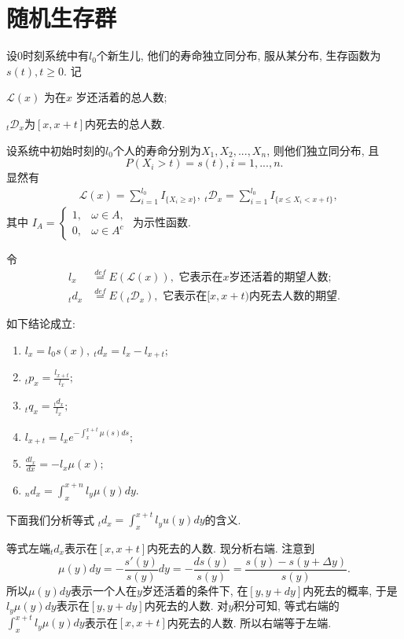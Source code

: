 \documentclass[lang=cn,10pt]{elegantbook}
\begin{document}
\section{随机生存群}
\begin{definition}[模型描述]
    设0时刻系统中有$l_0$个新生儿, 他们的寿命独立同分布, 服从某分布, 生存函数为$s(t),t\ge 0.$  记

    $\mathscr{L}(x)$ 为在$x$ 岁还活着的总人数;

    $_t \mathscr{D}_x$为$[x,x+t]$内死去的总人数.

    设系统中初始时刻的$l_0$个人的寿命分别为$X_1,X_2,...,X_n$, 则他们独立同分布, 且
    $$P(X_i>t)=s(t), i=1,...,n.$$
    显然有
    \begin{align*}
         & \mathscr{L}(x)=\sum_{i=1}^{l_0}I_{\{X_{i}\geqslant x\}},\ {}_t\mathscr{D}_x=\sum_{i=1}^{l_0}I_{\{ x\leqslant X_i<x+t\}},
    \end{align*}
    其中
    $
        I_{A}=\left\{\begin{array}{ll}1,&\omega\in A,\\0,&\omega\in A^c\end{array}\right.
    $ 为示性函数.

    令 \begin{align*}
        l_x     & \overset{def}{=}E(\mathscr L(x)), \text{ 它表示在}x\text{岁还活着的期望人数};        \\
        {}_td_x & \overset{def}{=}E({}_t\mathscr D_x ),\text{ 它表示在}[x,x+t)\text{内死去人数的期望}.
    \end{align*}
\end{definition}

\begin{corollary} 如下结论成立:
    \begin{enumerate}
        \item $l_x=l_0s(x),\ {}_td_x=l_x-l_{x+t};$
        \item ${}_tp_x=\frac{l_{x+t}}{l_x};$
        \item ${}_tq_x=\frac{{}_td_x}{l_x};$
        \item $l_{x+t}=l_xe^{-\int_{x}^{x+t}\mu(s)ds};$
        \item $\frac{dl_x}{dx}=-l_x\mu(x);$
        \item $_nd_x=\int_{x}^{x+n}l_y\mu(y)dy.$
    \end{enumerate}
\end{corollary}

\begin{remark} 下面我们分析等式
    ${}_td_x=\int_x^{x+t} l_yu(y)dy$的含义.

    等式左端${}_td_x$表示在$[x,x+t]$内死去的人数. 现分析右端. 注意到$$\mu(y)dy=-\dfrac{s'(y)}{s(y)}dy=-\dfrac{ds(y)}{s(y)}=\dfrac{s(y)-s(y+\Delta y)}{s(y)}.$$ 所以$\mu(y)dy$表示一个人在$y$岁还活着的条件下, 在$[y,y+dy]$内死去的概率, 于是$l_y\mu(y)dy$表示在$[y,y+dy]$内死去的人数. 对$y$积分可知, 等式右端的$\int_x^{x+t}l_y\mu(y)dy$表示在$[x,x+t]$内死去的人数. 所以右端等于左端.
\end{remark}
\end{document}
